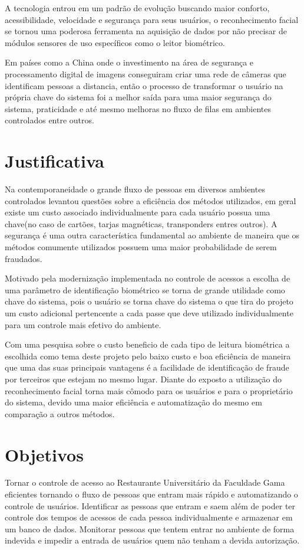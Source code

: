 \documentclass[conference,compsoc]{IEEEtran}
\begin{document}
A tecnologia entrou em um padrão de evolução buscando maior conforto, acessibilidade, velocidade e segurança
para seus usuários, o reconhecimento facial se tornou uma poderosa ferramenta na aquisição de dados por 
não precisar de módulos sensores de uso específicos como o leitor biométrico. 

Em países como a China onde o investimento na área de segurança e processamento digital de imagens conseguiram criar uma rede de câmeras que identificam pessoas a distancia, então o processo de transformar o usuário na própria chave do sistema
foi a melhor saída para uma maior segurança do sistema, praticidade e até mesmo melhoras no fluxo de filas em 
ambientes controlados entre outros.\cite{referencia:4} \cite{referencia:5} 

\section{Justificativa}
Na  contemporaneidade o grande fluxo de pessoas em diversos ambientes controlados levantou questões sobre a eficiência dos métodos utilizados, em geral existe um custo associado individualmente para cada usuário possua uma chave(no caso de cartões, tarjas magnéticas, transponders entres outros).  A segurança é uma outra característica fundamental ao ambiente de maneira que os métodos comumente utilizados possuem uma maior probabilidade de serem fraudados.

Motivado pela modernização implementada no controle de acessos a escolha de uma parâmetro de identificação biométrico se torna de grande utilidade como chave do sistema, pois o usuário se torna chave do sistema o que tira do projeto um custo adicional pertencente a cada passe que deve utilizado individualmente para um controle mais efetivo do ambiente.

Com uma pesquisa sobre o custo beneficio de cada tipo de leitura biométrica a escolhida como tema deste projeto pelo baixo custo e boa eficiência de maneira que uma das suas principais vantagens é a facilidade de identificação de fraude por terceiros que estejam no mesmo lugar. Diante do exposto a utilização do reconhecimento facial torna mais cômodo para os usuários e para o proprietário do sistema, devido uma maior eficiência e automatização do mesmo em comparação a outros métodos.
 
 \section{Objetivos}
Tornar o controle de acesso ao Restaurante Universitário da Faculdade Gama eficientes tornando o fluxo de pessoas que entram mais rápido e automatizando o controle de usuários.
Identificar as pessoas que entram e saem além de poder ter
controle dos tempos de acessos de cada pessoa individualmente e armazenar em um banco de dados.
Monitorar pessoas que tentem entrar no ambiente de forma
indevida e impedir a entrada de usuários quem não tenham a
devida autorização.
\end{document}
